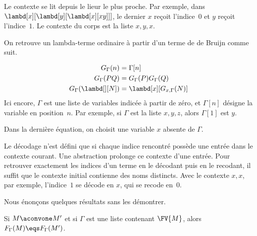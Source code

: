 \documentclass[../../../include/open-logic-section]{subfiles}
\begin{document}
\begin{explain}
Le contexte se lit depuis le lieur le plus proche. Par exemple,
dans $\lambd[x][\lambd[y][\lambd[x][x y]]]$, le dernier
$x$ reçoit l'indice~$0$ et $y$ reçoit l'indice~$1$.
Le contexte du corps est la liste $x,y,x$.
\end{explain}

On retrouve un lambda-terme ordinaire à
partir d'un terme de de Bruijn comme suit.

\begin{defn}
\begin{align*}
  G_\Gamma(n) &= \Gamma[n] \\
  G_\Gamma(PQ) &= G_\Gamma(P) G_\Gamma(Q) \\
  G_\Gamma(\lambd[][N])
    &= \lambd[x][G_{x,\Gamma}(N)]
\end{align*}
Ici encore, $\Gamma$ est une liste de
variables indicée à partir de zéro, et
$\Gamma[n]$ désigne la variable en
position~$n$. Par exemple, si $\Gamma$
est la liste $x,y,z$, alors $\Gamma[1]$
est $y$.

Dans la dernière équation, on choisit
une variable $x$ absente de $\Gamma$.
\end{defn}

\begin{explain}
Le décodage n'est défini que si chaque indice
rencontré possède une entrée dans le contexte
courant.
Une abstraction prolonge ce contexte d'une entrée. Pour
retrouver exactement les indices d'un terme en le décodant
puis en le recodant, il suffit que le contexte initial
contienne des noms distincts. Avec le contexte $x,x$, par
exemple, l'indice~$1$ se décode en $x$, qui se recode en~$0$.
\end{explain}

Nous énonçons quelques résultats sans les
démontrer.

\begin{prop}
Si $M \aconvone M'$ et si $\Gamma$ est une
liste contenant $\FV{M}$, alors
$F_\Gamma(M) \eqs F_\Gamma(M')$.
\end{prop}
\end{document}
